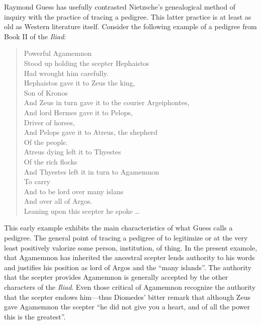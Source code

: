 Raymond Guess has usefully contrasted Nietzsche's genealogical method of inquiry with the practice of tracing a pedigree. This latter practice is at least as old as Western literature itself. Consider the following example of a pedigree from Book II of the \emph{Iliad}:
\begin{verse}
    Powerful Agamemnon \\
    Stood up holding the scepter Hephaistos \\
    Had wrought him carefully. \\
    Hephaistos gave it to Zeus the king, \\
    Son of Kronos \\
    And Zeus in turn gave it to the courier Argeiphontes, \\
    And lord Hermes gave it to Pelops, \\
    Driver of horses, \\
    And Pelops gave it to Atreus, the shepherd \\
    Of the people. \\
    Atreus dying left it to Thyestes \\
    Of the rich flocks \\
    And Thyestes left it in turn to Agamemnon \\
    To carry \\
    And to be lord over many islans \\
    And over all of Argos. \\
    Leaning upon this scepter he spoke \ldots \\
\end{verse}
This early example exhibits the main characteristics of what Guess calls a pedigree. The general point of tracing a pedigree of to legitimize or at the very least positively valorize some person, institution, of thing. In the present examole, that Agamemnon has inherited the ancestral scepter lends authority to his words and justifies his position as lord of Argos and the ``many islands''. The authority that the scepter provides Agamemnon is generally accepted by the other characters of the \emph{Iliad}. Even those critical of Agamemnon recognize the authority that the scepter endows him---thus Diomedes' bitter remark that although Zeus gave Agamemnon the scepter ``he did not give you a heart, and of all the power this is the greatest''.

